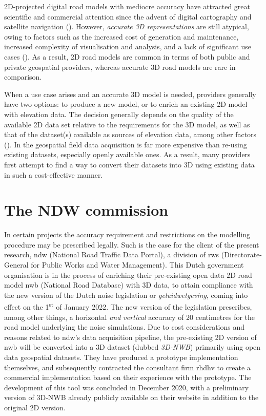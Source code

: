 2D-projected digital road models with mediocre accuracy have attracted great scientific and commercial attention since the advent of digital cartography and satellite navigation (\cite{taylor_etal_2001, fouque_bonnifait_2008, yue_etal_2008}). However, \textit{accurate 3D representations} are still atypical, owing to factors such as the increased cost of generation and maintenance, increased complexity of visualisation and analysis, and a lack of significant use cases (\cite{zhu_li_2007, wang_etal_2014}). As a result, 2D road models are common in terms of both public and private geospatial providers, whereas accurate 3D road models are rare in comparison.

When a use case arises and an accurate 3D model is needed, providers generally have two options: to produce a new model, or to enrich an existing 2D model with elevation data. The decision generally depends on the quality of the available 2D data set relative to the requirements for the 3D model, as well as that of the dataset(s) available as sources of elevation data, among other factors (\cite{zhu_li_2007, zhu_li_2008, wang_etal_2014}). In the geospatial field data acquisition is far more expensive than re-using existing datasets, especially openly available ones. As a result, many providers first attempt to find a way to convert their datasets into 3D using existing data in such a cost-effective manner.

\section{The NDW commission}
\label{sec:commission}

In certain projects the accuracy requirement and restrictions on the modelling procedure may be prescribed legally. Such is the case for the client of the present research, \ac{ndw} (National Road Traffic Data Portal), a division of \ac{rws} (Directorate-General for Public Works and Water Management). This Dutch government organisation is in the process of enriching their pre-existing open data 2D road model \ac{nwb} (National Road Database) with 3D data, to attain compliance with the new version of the Dutch noise legislation or \textit{geluidwetgeving}, coming into effect on the 1\textsuperscript{st} of January 2022. The new version of the legislation prescribes, among other things, a horizontal \textit{and vertical} accuracy of 20 centimetres for the road model underlying the noise simulations. Due to cost considerations and reasons related to \ac{ndw}’s data acquisition pipeline, the pre-existing 2D version of \ac{nwb} will be converted into a 3D dataset (dubbed \textit{3D-NWB}) primarily using open data geospatial datasets. They have produced a prototype implementation themselves, and subsequently contracted the consultant firm \ac{rhdhv} to create a commercial implementation based on their experience with the prototype. The development of this tool was concluded in December 2020, with a preliminary version of 3D-NWB already publicly available on their website in addition to the original 2D version.

